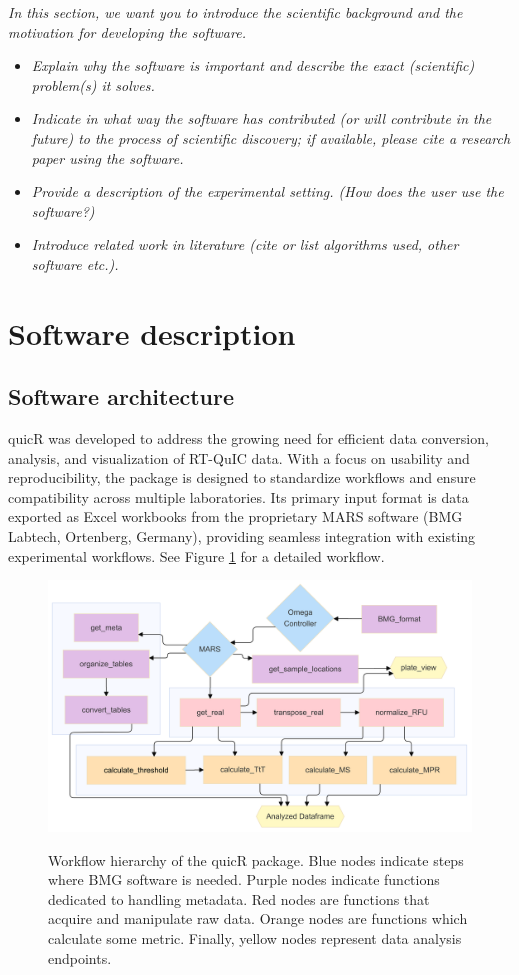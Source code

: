 \documentclass[preprint,12pt, a4paper]{elsarticle}
\begin{document}
\textit{In this section, we want you to introduce the scientific background and the motivation for developing the software.}

\begin{itemize}
    \item \textit{Explain why the software is important and describe the exact (scientific) problem(s) it solves.}
    \item \textit{Indicate in what way the software has contributed (or will contribute in the future) to the process of scientific discovery; if available, please cite a research paper using the software.}
    \item \textit{Provide a description of the experimental setting. (How does the user use the software?)}
    \item \textit{Introduce related work in literature (cite or list algorithms used, other software etc.).}
\end{itemize}

\section{Software description}
    \subsection{Software architecture}
        quicR was developed to address the growing need for efficient data conversion, analysis, and visualization of RT-QuIC data. With a focus on usability and reproducibility, the package is designed to standardize workflows and ensure compatibility across multiple laboratories. Its primary input format is data exported as Excel workbooks from the proprietary MARS software (BMG Labtech, Ortenberg, Germany), providing seamless integration with existing experimental workflows. See Figure \ref{fig:workflow} for a detailed workflow.
        \begin{figure}[ht]
            \caption{Workflow hierarchy of the quicR package. Blue nodes indicate steps where BMG software is needed. Purple nodes indicate functions dedicated to handling metadata. Red nodes are functions that acquire and manipulate raw data. Orange nodes are functions which calculate some metric. Finally, yellow nodes represent data analysis endpoints.}
            \centering
            \includegraphics[width=\textwidth]{images/workflow2.png}
            \label{fig:workflow}
        \end{figure}
\end{document}
